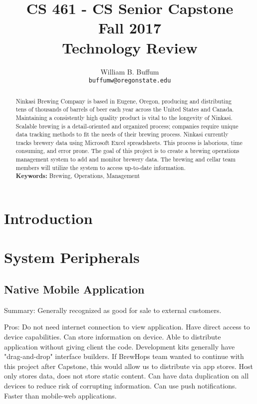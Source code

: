 \documentclass[draftclsnofoot,onecolumn,letterpaper,10pt,compsoc]{IEEEtran}
\title{CS 461 - CS Senior Capstone
	\\Fall 2017
	\\Technology Review
}
\author{
	William B. Buffum \\
	\texttt{buffumw@oregonstate.edu}
}
\begin{document}
\begin{titlingpage}
    \maketitle
    \begin{abstract}
      Ninkasi Brewing Company is based in Eugene, Oregon, producing and distributing tens of thousands of barrels of beer each year across the United States and Canada.
      Maintaining a consistently high quality product is vital to the longevity of Ninkasi.
      Scalable brewing is a detail-oriented and organized process; companies require unique data tracking methods to fit the needs of their brewing process.
      Ninkasi currently tracks brewery data using Microsoft Excel spreadsheets.
      This process is laborious, time consuming, and error prone.
      The goal of this project is to create a brewing operations management system to add and monitor brewery data.
      The brewing and cellar team members will utilize the system to access up-to-date information.
      \\
      \textbf{Keywords:} Brewing, Operations, Management
    \end{abstract}
		\pagebreak
		\tableofcontents
\end{titlingpage}

\section{Introduction}

\section{System Peripherals}
	\subsection{Native Mobile Application}
    Summary:
        Generally recognized as good for sale to external customers.
    
    Pros:
        Do not need internet connection to view application.
        Have direct access to device capabilities.
        Can store information on device.
        Able to distribute application without giving client the code.
        Development kits generally have "drag-and-drop" interface builders.
        If BrewHops team wanted to continue with this project after             Capstone, this would allow us to distribute via app stores.
        Host only stores data, does not store static content.
        Can have data duplication on all devices to reduce risk of              corrupting information.
        Can use push notifications.
        Faster than mobile-web applications.
        
\end{document}
